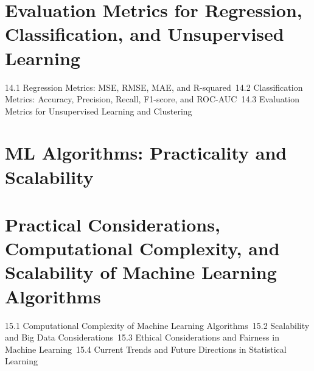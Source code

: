 \section{Evaluation Metrics for Regression, Classification, and Unsupervised Learning}
14.1 Regression Metrics: MSE, RMSE, MAE, and R-squared\
14.2 Classification Metrics: Accuracy, Precision, Recall, F1-score, and ROC-AUC\
14.3 Evaluation Metrics for Unsupervised Learning and Clustering\
\section{ML Algorithms: Practicality and Scalability}
\section{Practical Considerations, Computational Complexity, and Scalability of Machine Learning Algorithms}
15.1 Computational Complexity of Machine Learning Algorithms\
15.2 Scalability and Big Data Considerations\
15.3 Ethical Considerations and Fairness in Machine Learning\
15.4 Current Trends and Future Directions in Statistical Learning\
